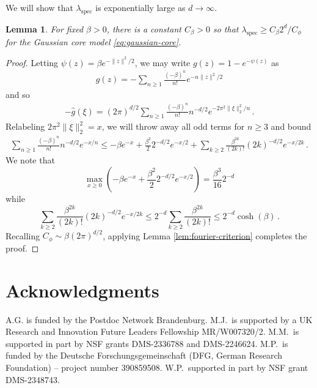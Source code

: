 \documentclass[10pt]{amsart}
\newtheorem{lemma}[theorem]{Lemma}
\theoremstyle{definition}
\theoremstyle{remark}
\newcommand{\spec}{{\mathrm{spec}}}
\begin{document}
	We will show that $\lambda_\spec$ is exponentially large as $d \to \infty$.
	\begin{lemma}\label{lem:gaussian-core-bound}
		For fixed $\beta > 0$, there is a constant $C_\beta > 0$ so that $\lambda_{\spec} \geq  C_\beta 2^d / C_\phi$ for the Gaussian core model \eqref{eq:gaussian-core}.
	\end{lemma}
	\begin{proof}
		Letting $\psi(z) = \beta e^{-\|z\|^2 / 2}$, we may write $g(z) = 1 - e^{-\psi(z)}$ as \begin{align*}
			g(z) = -\sum_{n \geq 1} \frac{(-\beta)^n}{n!} e^{-n \|z\|^2 / 2} 
		\end{align*}
		and so \begin{align*}
			-\widehat{g}(\xi) = (2\pi)^{d/2} \sum_{n \geq 1} \frac{(-\beta)^n}{n!} n^{-d/2} e^{-2\pi^2 \|\xi\|_2^2 / n} \,.
		\end{align*}
		Relabeling $2\pi^2 \|\xi\|_2^2 = x$, we will throw away all odd terms for $n \geq 3$ and bound \begin{align*}
			\sum_{n \geq 1} \frac{(-\beta)^n}{n!} n^{-d/2} e^{-x / n} \leq -\beta e^{-x} + \frac{\beta^2}{2} 2^{-d/2} e^{-x/2} + \sum_{k\geq 2} \frac{\beta^{2k}}{(2k)!} (2k)^{-d/2} e^{-x/2k}\,.
		\end{align*}
		We note that \begin{equation*}
			\max_{x \geq 0}\left( -\beta e^{-x} + \frac{\beta^2}{2} 2^{-d/2} e^{-x/2} \right) = \frac{\beta^3}{16} 2^{-d}
		\end{equation*}
		while \begin{equation*}
			\sum_{k\geq 2} \frac{\beta^{2k}}{(2k)!} (2k)^{-d/2} e^{-x/2k} \leq 2^{-d} \sum_{k \geq 2} \frac{\beta^{2k}}{(2k)!} \leq 2^{-d} \cosh(\beta) \,.
		\end{equation*}
		Recalling $C_\phi \sim \beta (2\pi)^{d/2}$, applying Lemma \ref{lem:fourier-criterion} completes the proof.
	\end{proof}
	
	
	
	
	\section*{Acknowledgments}
	A.G. is funded by the Postdoc Network Brandenburg.
	M.J.\ is supported by a UK Research and Innovation Future Leaders Fellowship MR/W007320/2.  M.M.\ is supported in part by NSF grants DMS-2336788 and DMS-2246624.
	M.P.\ is funded by the Deutsche Forschungsgemeinschaft (DFG, German Research Foundation) -- project number 390859508.
	W.P.\ supported in part by NSF grant DMS-2348743. 
	
\end{document}
